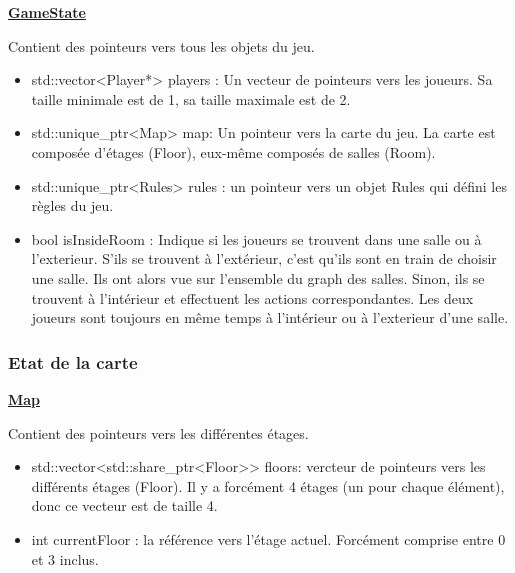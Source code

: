 \underline{\textbf{GameState}}
\par Contient des pointeurs vers tous les objets du jeu.
\begin{itemize}
    \item std::vector<Player*> players : Un vecteur de pointeurs vers les joueurs. Sa taille minimale est de 1, sa taille maximale est de 2.
    \item std::unique\_ptr<Map> map: Un pointeur vers la carte du jeu. La carte est composée d'étages (Floor), eux-même composés de salles (Room). 
    \item std::unique\_ptr<Rules> rules : un pointeur vers un objet Rules qui défini les règles du jeu.
    \item  bool isInsideRoom : Indique si les joueurs se trouvent dans une salle ou  à l'exterieur. S'ils se trouvent à l'extérieur, c'est qu'ils sont en train de choisir une salle. Ils ont alors vue sur l'ensemble du graph des salles. Sinon, ils se trouvent à l'intérieur et effectuent les actions correspondantes. Les deux joueurs sont toujours en même temps à l'intérieur ou à l'exterieur d'une salle.
\end{itemize}

\subsubsection{Etat de la carte}
\underline{\textbf{Map}}
\par Contient des pointeurs vers les différentes étages.
\begin{itemize}
    \item std::vector<std::share\_ptr<Floor>> floors: vercteur de pointeurs vers les différents étages (Floor). Il y a forcément 4 étages (un pour chaque élément), donc ce vecteur est de taille 4. 
    \item int currentFloor : la référence vers l'étage actuel. Forcément comprise entre 0 et 3 inclus.
\end{itemize}

